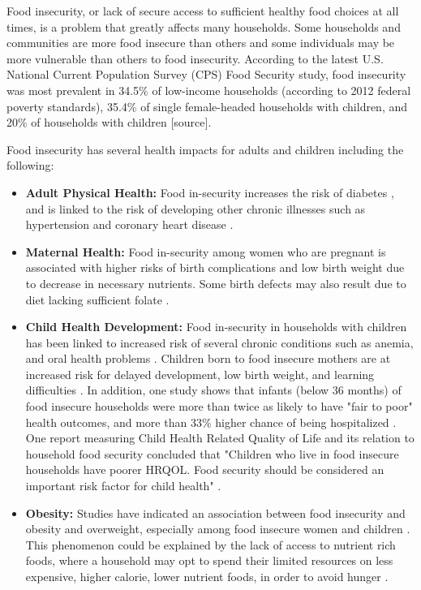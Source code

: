 \documentclass[12pt,letterpaper]{report}
\begin{document}
Food insecurity, or lack of secure access to sufficient healthy food choices at all times, is a problem that greatly affects many households. Some households and communities are more food insecure than others and some individuals may be more vulnerable than others to food insecurity. According to the latest U.S. National Current Population Survey (CPS) Food Security study, food insecurity was most prevalent in 34.5\% of low-income households (according to 2012 federal poverty standards), 35.4\% of single female-headed households with children, and 20\% of households with children [source].

Food insecurity has several health impacts for adults and children including the following:
\begin{itemize}
\item\textbf{Adult Physical Health:} Food in-security increases the risk of diabetes \cite{seligman2007food}, and is linked to the risk of developing other chronic illnesses such as hypertension and coronary heart disease \cite{seligman2010food}.
\item\textbf{Maternal Health:} Food in-security among women who are pregnant is associated with higher risks of birth complications and low birth weight due to decrease in necessary nutrients\cite{tarasuk2001household}. Some birth defects may also result due to diet lacking sufficient folate \cite{bailey2010folate}.
\item\textbf{Child Health Development:} Food in-security in households with children has been linked to increased risk of several chronic conditions such as anemia, and oral health problems \cite{muirhead2009oral, eicher2009food}. Children born to food insecure mothers are at increased risk for delayed development, low birth weight, and learning difficulties \cite{cook2008brief, skalicky2006child, jyoti2005food, cook2004food}. In addition, one study shows that infants (below 36 months) of food insecure households were more than twice as likely to have "fair to poor" health outcomes, and more than 33\% higher chance of being hospitalized \cite{cook2004food}. One report measuring Child Health Related Quality of Life and its relation to household food security concluded that "Children who live in food insecure households have poorer HRQOL. Food security should be considered an important risk factor for child health" \cite{casey2005child}.
\item\textbf{Obesity:}  Studies have indicated an association between food insecurity and obesity and overweight, especially among food insecure women and children \cite{bronte2007food, martin2007food, wilde2006individual, casey2006association, alaimo2001low, townsend2001food}. This phenomenon could be explained by the lack of access to nutrient rich foods, where a household may opt to spend their limited resources on less expensive, higher calorie, lower nutrient foods, in order to avoid hunger \cite{drewnowski2004poverty}. 
\end{itemize}
\end{document}
